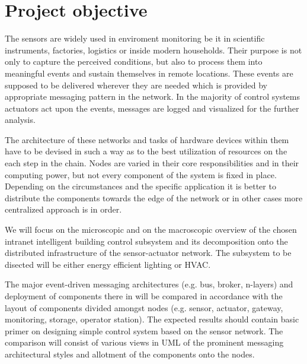 \documentclass[11pt,english,a4paper,twoside]{article}
\title{\reporttitle}
\author{Bc. Miroslav Hájek}
\date{Faculty of Informatics and Information Technologies\\
      Slovak University of Technology in Bratislava\\[6pt]
      October 6, 2022}
\begin{document}
\maketitle

\section*{Project objective}
The sensors are widely used in enviroment monitoring be it in scientific instruments, factories, logistics or inside modern households.  
Their purpose is not only to capture the perceived conditions, but also to process them into meaningful events and sustain themselves in remote locations. These events are supposed to be delivered wherever they are needed which is provided by 
appropriate messaging pattern in the network. In the majority of control systems actuators act upon the events, messages are
logged and visualized for the further analysis.

The architecture of these networks and tasks of hardware devices within them have to be devised in such a way as to the best utilization of 
resources on the each step in the chain. Nodes are varied in their core responsibilities and in their computing power, 
but not every component of the system is fixed in place. Depending on the circumstances and the specific application 
it is better to distribute the components towards the edge of the network or in other cases more centralized approach is in order.

We will focus on the microscopic and on the macroscopic overview of the chosen intranet intelligent 
building control subsystem and its decomposition onto the distributed infrastructure of the sensor-actuator network. 
The subsystem to be disected will be either energy efficient lighting or HVAC.

The major event-driven messaging architectures (e.g. bus, broker, n-layers) and deployment of components there in will 
be compared in accordance with the layout of components divided amongst nodes (e.g. sensor, actuator, gateway, monitoring,
storage, operator station). The expected results should contain basic primer on designing simple control system based 
on the sensor network. The comparison will consist of various views in UML of the prominent messaging architectural styles and 
allotment of the components onto the nodes.

\nocite{*}
\printbibliography
\end{document}
